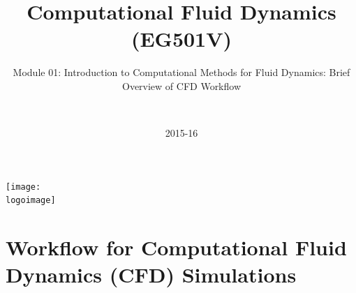 \documentclass[10pt,compress,handout,ignorenonframetext]{beamer}
\institute{School of Engineering}
\title{Computational Fluid Dynamics (EG501V)}
\subtitle{Module 01: Introduction to Computational Methods for Fluid Dynamics: Brief Overview of CFD Workflow}
\date[2015-16]{2015-16}
\author[\shortname]{%
  \fullname\\\ttfamily{\emailaddress}
}
\newcommand{\logoimage}{./FigBanner/UoAHorizBanner}
\begin{document}
\begin{frame}
  \titlepage
  \vfill%
  \begin{center}
    \texttt{[image: \\logoimage]}
  \end{center}
\end{frame}






\section{Workflow for Computational Fluid Dynamics (CFD) Simulations}

\end{document}
